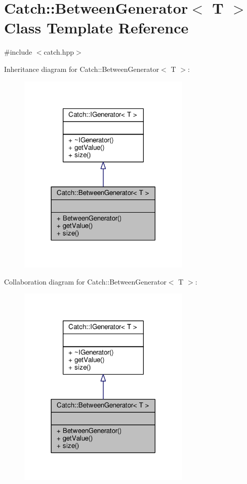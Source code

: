 \hypertarget{class_catch_1_1_between_generator}{\section{Catch\-:\-:Between\-Generator$<$ T $>$ Class Template Reference}
\label{class_catch_1_1_between_generator}
}


{\ttfamily \#include $<$catch.\-hpp$>$}



Inheritance diagram for Catch\-:\-:Between\-Generator$<$ T $>$\-:
\nopagebreak
\begin{figure}[H]
\begin{center}
\leavevmode
\includegraphics[width=234pt]{class_catch_1_1_between_generator__inherit__graph}
\end{center}
\end{figure}


Collaboration diagram for Catch\-:\-:Between\-Generator$<$ T $>$\-:
\nopagebreak
\begin{figure}[H]
\begin{center}
\leavevmode
\includegraphics[width=234pt]{class_catch_1_1_between_generator__coll__graph}
\end{center}
\end{figure}
